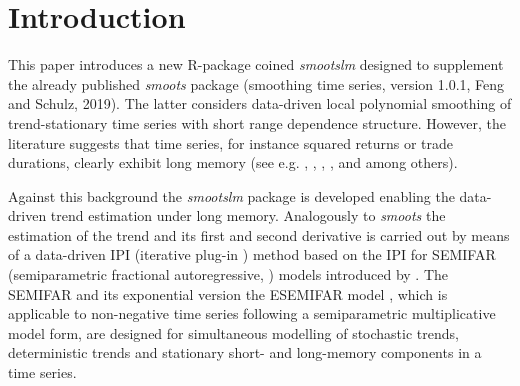 \documentclass[12pt]{article}
\begin{document}
\section{Introduction}
This paper introduces a new R-package coined \textit{smootslm} designed to supplement the already published \textit{smoots} package (smoothing time series, version 1.0.1, Feng and Schulz, 2019). The latter considers data-driven local polynomial smoothing of trend-stationary time series with short range dependence structure. However, the literature suggests that time series, for instance squared returns or trade durations, clearly exhibit long memory (see e.g. \cite{ding1993long}, \cite{ding1996modeling}, \cite{andersen1997intraday}, \cite{andersen1999forecasting}, \cite{cotter2005uncovering} and \cite{beran2015modelling} among others).  
  
Against this background the \textit{smootslm} package is developed enabling the data-driven trend estimation under long memory. Analogously to \textit{smoots} the estimation of the trend and its first and second derivative is carried out by means of a data-driven IPI (iterative plug-in \cite{gasser1991flexible}) method based on the IPI for SEMIFAR (semiparametric fractional autoregressive, \cite{beran2002semifar}) models introduced by \citet{beran2002iterative}. The SEMIFAR and its exponential version the ESEMIFAR model \citep{beran2015modelling}, which is applicable to non-negative time series following a semiparametric multiplicative model form, are designed for simultaneous modelling of stochastic trends, deterministic trends and stationary short- and long-memory components in a time series.
\end{document}
